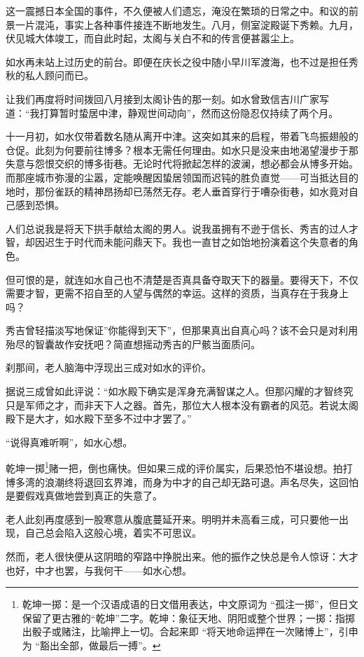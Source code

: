 \documentclass[
]{article}
\begin{document}
这一震撼日本全国的事件，不久便被人们遗忘，淹没在繁琐的日常之中。和议的前景一片混沌，事实上各种事件接连不断地发生。八月，侧室淀殿诞下秀赖。九月，伏见城大体竣工，而自此时起，太阁与关白不和的传言便甚嚣尘上。

如水再未站上过历史的前台。即便在庆长之役中随小早川军渡海，也不过是担任秀秋的私人顾问而已。

让我们再度将时间拨回八月接到太阁讣告的那一刻。如水曾致信吉川广家写道：``我打算暂时蛰居中津，静观世间动向''，然而这份隐忍仅持续了两个月。

十一月初，如水仅带着数名随从离开中津。这突如其来的启程，带着飞鸟振翅般的仓促。此刻为何要前往博多？根本无需任何理由。如水只是没来由地渴望漫步于那失意与怨恨交织的博多街巷。无论时代将掀起怎样的波澜，想必都会从博多开始。而那座城市弥漫的尘嚣，定能唤醒因蛰居领国而迟钝的胜负直觉------可当抵达目的地时，那份雀跃的精神昂扬却已荡然无存。老人垂首穿行于嘈杂街巷，如水竟对自己感到恐惧。

人们总说我是将天下拱手献给太阁的男人。说我虽拥有不逊于信长、秀吉的过人才智，却因迟生于时代而未能问鼎天下。我也一直甘之如饴地扮演着这个失意者的角色。

但可恨的是，就连如水自己也不清楚是否真具备夺取天下的器量。要得天下，不仅需要才智，更需不招自至的人望与偶然的幸运。这样的资质，当真存在于我身上吗？

秀吉曾轻描淡写地保证''你能得到天下''，但那果真出自真心吗？该不会只是对利用殆尽的智囊故作安抚吧？简直想摇动秀吉的尸骸当面质问。

刹那间，老人脑海中浮现出三成对如水的评价。

据说三成曾如此评说：``如水殿下确实是浑身充满智谋之人。但那闪耀的才智终究只是军师之才，而非天下人之器。首先，那位大人根本没有霸者的风范。若说太阁殿下是大才，如水殿下至多不过中才罢了。''

``说得真难听啊''，如水心想。

乾坤一掷\footnote{乾坤一掷：是一个汉语成语的日文借用表达，中文原词为 ``孤注一掷''，但日文保留了更古雅的``乾坤''二字。乾坤：象征天地、阴阳或整个世界；一掷：指掷出骰子或赌注，比喻押上一切。合起来即 ``将天地命运押在一次赌博上''，引申为 ``豁出全部，做最后一搏''。}赌一把，倒也痛快。但如果三成的评价属实，后果恐怕不堪设想。拍打博多湾的浪潮终将退回玄界滩，而身为中才的自己却无路可退。声名尽失，这回怕是要假戏真做地尝到真正的失意了。

老人此刻再度感到一股寒意从腹底蔓延开来。明明并未高看三成，可只要他一出现，自己总会陷入这般心境，着实不可思议。

然而，老人很快便从这阴暗的窄路中挣脱出来。他的振作之快总是令人惊讶：大才也好，中才也罢，与我何干------如水心想。
\end{document}
